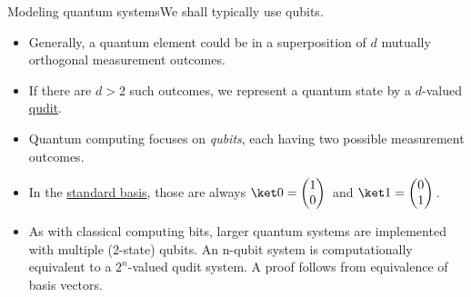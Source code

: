 \begin{frame}{Modeling quantum systems}{We shall typically use qubits.}
\begin{itemize}
    \item<1-> Generally, a quantum element could be in a superposition of $d$ mutually orthogonal measurement outcomes.
    \item<2-> If there are $d>2$ such outcomes, we represent a quantum state by a $d$-valued 
    \href{https://en.wiktionary.org/wiki/qudit}{qudit}. 
    \item<4-> Quantum computing focuses on \emph{qubits}, each having two possible measurement outcomes.
    \item<5-> In the \href{https://en.wikipedia.org/wiki/Qubit\#Qubit_states}{standard basis}, those are always $\QZero{}=\PZero{}$ and $\QOne{} = \POne{}$.
    \item<6-> As with classical computing bits, larger quantum systems are implemented with multiple (2-state) qubits. An n-qubit system is computationally equivalent to a $2^{n}$-valued qudit system. A proof follows from equivalence of basis vectors.
\end{itemize}
\end{frame}
